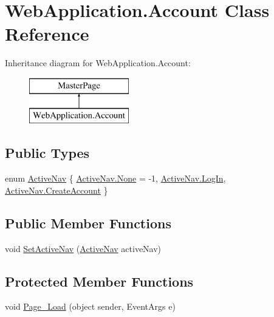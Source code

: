 \hypertarget{classWebApplication_1_1Account}{}\section{Web\+Application.\+Account Class Reference}
\label{classWebApplication_1_1Account}
Inheritance diagram for Web\+Application.\+Account\+:\begin{figure}[H]
\begin{center}
\leavevmode
\includegraphics[height=2.000000cm]{dd/db3/classWebApplication_1_1Account}
\end{center}
\end{figure}
\subsection*{Public Types}
\begin{DoxyCompactItemize}
\item 
enum \mbox{\hyperlink{classWebApplication_1_1Account_a10ae11fc0b7ab15a9407a87d6c112809}{Active\+Nav}} \{ \mbox{\hyperlink{classWebApplication_1_1Account_a10ae11fc0b7ab15a9407a87d6c112809a6adf97f83acf6453d4a6a4b1070f3754}{Active\+Nav.\+None}} = -\/1, 
\mbox{\hyperlink{classWebApplication_1_1Account_a10ae11fc0b7ab15a9407a87d6c112809a2f2951c2e84242a4746a6c569b2dd879}{Active\+Nav.\+Log\+In}}, 
\mbox{\hyperlink{classWebApplication_1_1Account_a10ae11fc0b7ab15a9407a87d6c112809a4adeb1d60fd8acece3838957ea3fa424}{Active\+Nav.\+Create\+Account}}
 \}
\end{DoxyCompactItemize}
\subsection*{Public Member Functions}
\begin{DoxyCompactItemize}
\item 
void \mbox{\hyperlink{classWebApplication_1_1Account_a56297d5833d2640c12bb6fbd606637a6}{Set\+Active\+Nav}} (\mbox{\hyperlink{classWebApplication_1_1Account_a10ae11fc0b7ab15a9407a87d6c112809}{Active\+Nav}} active\+Nav)
\end{DoxyCompactItemize}
\subsection*{Protected Member Functions}
\begin{DoxyCompactItemize}
\item 
void \mbox{\hyperlink{classWebApplication_1_1Account_ae857a22942da6ad8aaaa0022dd7a5c78}{Page\+\_\+\+Load}} (object sender, Event\+Args e)
\end{DoxyCompactItemize}
